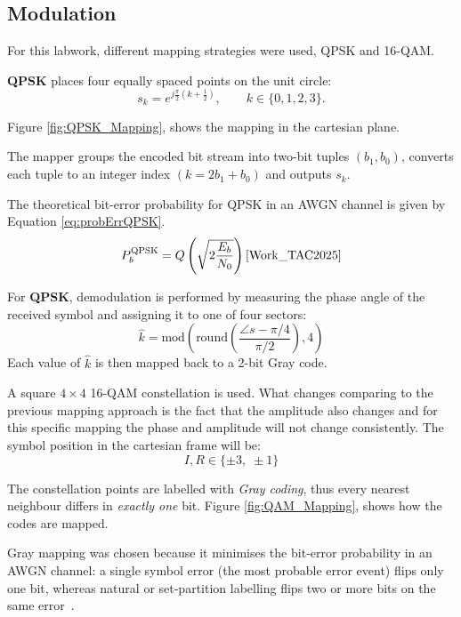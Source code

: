 \newpage
\subsection{Modulation}
\label{ssec:modulations}
For this labwork, different mapping strategies were used, QPSK and 16-QAM.

\textbf{QPSK} places four equally spaced points on the unit circle:
\[
s_k = e^{j\frac{\pi}{2}\left(k+\tfrac12\right)}, \qquad k\in\{0,1,2,3\}.
\]

Figure \ref{fig:QPSK_Mapping}, shows the mapping in the cartesian plane.


The mapper groups the encoded bit stream into two-bit tuples $(b_1,b_0)$, converts each tuple to an integer index $(k =2b_1+b_0)$ and outputs \(s_k\).

The theoretical bit-error probability for QPSK in an AWGN channel is given by Equation \ref{eq:probErrQPSK}.
\begin{equation}
  P_b^{\text{QPSK}} = Q\left(\sqrt{2\frac{E_b}{N_0}}\right)\text{\cite{Work_TAC2025}}
  \label{eq:probErrQPSK}
\end{equation}

For \textbf{QPSK}, demodulation is performed by measuring the phase angle of the received symbol and assigning it to one of four sectors:
\[
\hat{k} = \text{mod}\left( \text{round}\left( \frac{\angle s - \pi/4}{\pi/2} \right), 4 \right)
\]
Each value of $\hat{k}$ is then mapped back to a 2-bit Gray code.


A square $4\times4$ 16-QAM constellation is used. What changes comparing to the previous mapping approach is the fact that the amplitude also changes and for this specific mapping the phase and amplitude will not change consistently. The symbol position in the cartesian frame will be:
\[
I,R \in \{\pm3,\;\pm1\}
\]

The constellation points are labelled with \emph{Gray coding}, thus every nearest neighbour differs in \emph{exactly one} bit. Figure \ref{fig:QAM_Mapping}, shows how the codes are mapped.

Gray mapping was chosen because it minimises the bit‑error probability in an AWGN channel: a single symbol error (the most probable error event) flips only one bit, whereas natural or set‑partition labelling flips two or more bits on the same error~\cite{Work_TAC2025}.  

